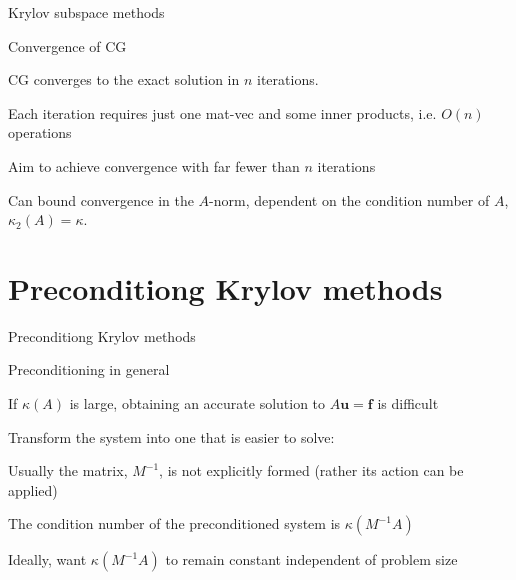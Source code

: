 \documentclass[18pt,xcolor=table]{beamer}
\begin{document}
\begin{frame}{Krylov subspace methods}
\begin{block}{Convergence of CG}
\bit
\item CG converges to the exact solution in $n$ iterations.
\item Each iteration requires just one mat-vec and some inner products, i.e. $O(n)$ operations
\item Aim to achieve convergence with far fewer than $n$ iterations
\item Can bound convergence in the $A$-norm, dependent on the condition number of $A$, $\kappa_2(A) = \kappa$.
\eit
{}
\end{block}
\end{frame}


\section{Preconditiong Krylov methods}

\begin{frame}{Preconditiong Krylov methods}
\begin{block}{Preconditioning in general}
\bit
\item If $\kappa(A)$ is large, obtaining an accurate solution to $A\mathbf{u} = \mathbf{f}$ is difficult
\item Transform the system into one that is easier to solve:
\item Usually the matrix, $M^{-1}$, is not explicitly formed (rather its action can be applied)
\item The condition number of the preconditioned system is $\kappa(M^{-1}A)$
\item Ideally, want $\kappa(M^{-1}A)$ to remain constant independent of problem size
\eit
\end{block}
\end{frame}
\end{document}
